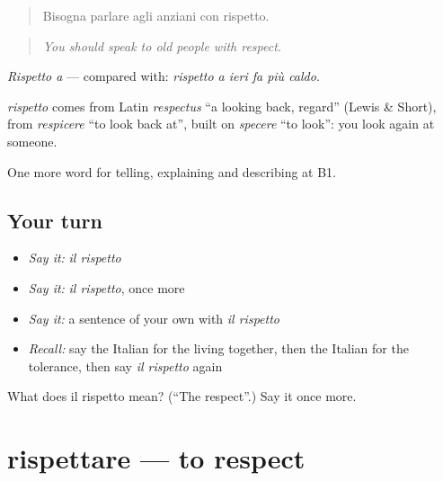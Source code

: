 \begin{quote}
Bisogna parlare agli anziani con rispetto.
\end{quote}

\begin{quote}
\emph{You should speak to old people with respect.}
\end{quote}

\emph{Rispetto a} — compared with: \emph{rispetto a ieri fa più caldo}.

\begin{cousinweb}
\emph{rispetto} comes from Latin \emph{respectus} \textquotedblleft{}a looking back, regard\textquotedblright{} (Lewis \& Short), from \emph{respicere} \textquotedblleft{}to look back at\textquotedblright{}, built on \emph{specere} \textquotedblleft{}to look\textquotedblright{}: you look again at someone.
\end{cousinweb}

\begin{grammarlens}[title={What you've built}]
One more word for telling, explaining and describing at B1.
\end{grammarlens}

\subsection*{Your turn}
\begin{itemize}
\raggedright
  \item \emph{Say it:} \emph{il rispetto}
  \item \emph{Say it:} \emph{il rispetto}, once more
  \item \emph{Say it:} a sentence of your own with \emph{il rispetto}
  \item \emph{Recall:} say the Italian for the living together, then the Italian for the tolerance, then say \emph{il rispetto} again
\end{itemize}

\begin{tcolorbox}[breakable,colback=teal!4,colframe=teal!35!black,title={Before you move on}]
What does il rispetto mean? (\textquotedblleft{}The respect\textquotedblright{}.) Say it once more.
\end{tcolorbox}
\section[rispettare]{rispettare — to respect}

\label{lesson:IT-C368-rispettare}



